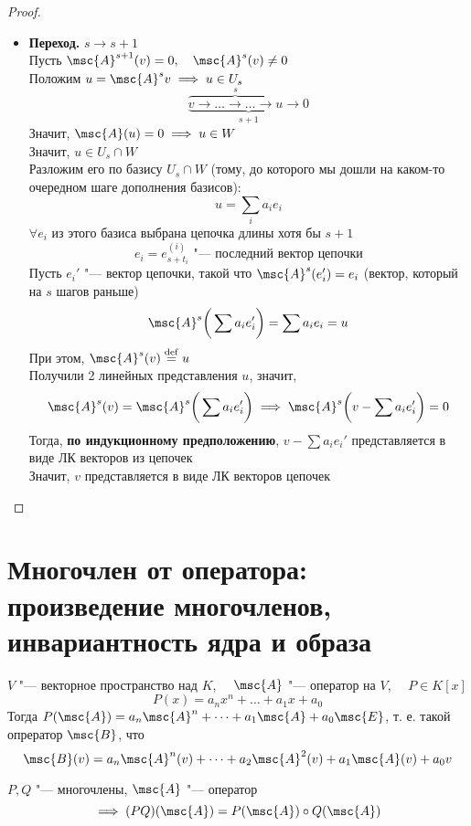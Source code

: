 \begin{proof}
\begin{itemize}
		\item \textbf{Переход.} $ s \to s + 1 $ \\
		Пусть $ \msc{A}^{s + 1}(v) = 0, \quad \msc{A}^s(v) \ne 0 $ \\
		Положим $ u = \msc{A}^s v \implies u \in U_s $
		$$ \underbrace{\overbrace{v \to \dots \to \dots \to u}^s \to 0}_{s + 1} $$
		Значит, $ \msc{A}(u) = 0 \implies u \in W $ \\
		Значит, $ u \in U_s \cap W $ \\
		Разложим его по базису $ U_s \cap W $ (тому, до которого мы дошли на каком-то очередном шаге дополнения базисов):
		$$ u = \sum_i a_ie_i $$
		$ \forall e_i $ из этого базиса выбрана цепочка длины хотя бы $ s + 1 $
		$$ e_i = e_{s + t_i}^{(i)} \text{ "--- последний вектор цепочки} $$
		Пусть $ e_i' $ "--- вектор цепочки, такой что $ \msc{A}^s(e_i') = e_i $ (вектор, который на $ s $ шагов раньше)
		$$ \msc{A}^s \bigg( \sum a_ie_i' \bigg) = \sum a_ie_i = u $$
		При этом, $ \msc{A}^s(v) \bydef u $ \\
		Получили 2 линейных представления $ u $, значит,
		$$ \msc{A}^s(v) = \msc{A}^s \bigg( \sum a_ie_i' \bigg) \implies \msc{A}^s \bigg( v - \sum a_ie_i' \bigg) = 0 $$
		Тогда, \textbf{по индукционному предположению}, $ v - \sum a_ie_i' $ представляется в виде ЛК векторов из цепочек \\
		Значит, $ v $ представляется в виде ЛК векторов цепочек
	\end{itemize}
\end{proof}

\section{Многочлен от оператора: произведение многочленов, инвариантность ядра и образа}

\begin{notation}
	$ V $ "--- векторное пространство над $ K $, $ \quad \msc{A} $ "--- оператор на $ V $, $ \quad P \in K[x] $
	$$ P(x) = a_nx^n + \dots + a_1x + a_0 $$
	Тогда $ P(\msc{A}) = a_n\msc{A}^n + \dots + a_1\msc{A} + a_0\msc{E} $, т. е. такой опрератор $ \msc{B} $, что
	$$ \msc{B}(v) = a_n \msc{A}^n(v) + \dots + a_2\msc{A}^2(v) + a_1\msc{A}(v) + a_0v $$
\end{notation}

\begin{lemma}
	$ P, Q $ "--- многочлены, $ \msc{A} $ "--- оператор
	$$ \implies (PQ)(\msc{A}) = P(\msc{A}) \circ Q(\msc{A}) $$
\end{lemma}

